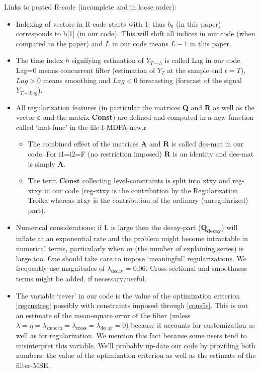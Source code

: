 \documentclass[11pt]{article}
\begin{document}
Links to posted R-code (incomplete and in loose order):
\begin{itemize}
\item Indexing of vectors in R-code starts with 1: thus $b_0$ (in this paper) corresponds to b[1] (in our code). This will shift all indices in our code (when compared to the paper) and $L$ in our code means $L-1$ in this paper.
\item The time index $h$ signifying estimation of $Y_{T-h}$ is called Lag in our code. Lag=0 means concurrent filter (estimation of $Y_T$ at the sample end $t=T$), $Lag>0$ means smoothing and $Lag<0$ forecasting (forecast of the signal $Y_{T+Lag}$).
\item All regularization features (in particular the matrices \textbf{Q} and \textbf{R} as well as the vector \textbf{c} and the matrix \textbf{Const}) are defined and computed in a new function called `mat-func' in the file I-MDFA-new.r
\begin{itemize}
\item The combined effect of the matrices $\mathbf{A}$ and $\mathbf{R}$ is called des-mat in our code. For i1=i2=F (no restriction imposed) $\mathbf{R}$ is an identity and  des-mat is simply $\mathbf{A}$. 
\item The term $\mathbf{Const}$ collecting level-constraints is split into xtxy and reg-xtxy in our code (reg-xtxy is the contribution by the Regularization Troika whereas xtxy is the contribution of the ordinary (unregularized) part).
\end{itemize}
\item Numerical considerations: if  L is large then the decay-part ($\mathbf{Q_{\textrm{decay}}}$) will inflate at an exponential rate and the problem might become intractable in numerical terms, particularly when $m$ (the number of explaining series) is large too. One should take care to impose `meaningful' regularizations. We frequently use magnitudes of $\lambda_{\textrm{decay}}=0.06$. Cross-sectional and smoothness terms might be added, if necessary/useful.
\item The variable `rever' in our code is the value of the optimization criterion \ref{regcustreg} possibly with constraints imposed through \ref{cons5s}. This is not an estimate of the mean-square error of the filter (unless $\lambda=\eta=\lambda_{\textrm{smooth}}=\lambda_{\textrm{cross}}=\lambda_{\textrm{decay}}=0$) because it accounts for customization as well as for regularization. We mention this fact because some users tend to misinterpret this variable. We'll probably up-date our code by providing both numbers: the value of the optimization criterion as well as the estimate of the filter-MSE.
\end{itemize}
\end{document}
